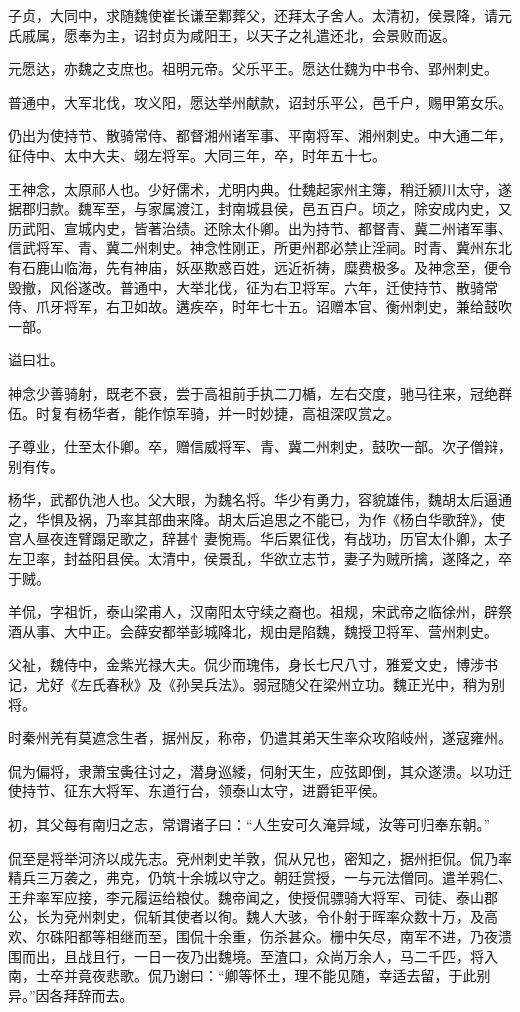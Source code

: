 \documentclass[12pt,UTF8]{ctexbook}
\begin{document}
子贞，大同中，求随魏使崔长谦至鄴葬父，还拜太子舍人。太清初，侯景降，请元氏戚属，愿奉为主，诏封贞为咸阳王，以天子之礼遣还北，会景败而返。

元愿达，亦魏之支庶也。祖明元帝。父乐平王。愿达仕魏为中书令、郢州刺史。

普通中，大军北伐，攻义阳，愿达举州献款，诏封乐平公，邑千户，赐甲第女乐。

仍出为使持节、散骑常侍、都督湘州诸军事、平南将军、湘州刺史。中大通二年，征侍中、太中大夫、翊左将军。大同三年，卒，时年五十七。

王神念，太原祁人也。少好儒术，尤明内典。仕魏起家州主簿，稍迁颍川太守，遂据郡归款。魏军至，与家属渡江，封南城县侯，邑五百户。顷之，除安成内史，又历武阳、宣城内史，皆著治绩。还除太仆卿。出为持节、都督青、冀二州诸军事、信武将军、青、冀二州刺史。神念性刚正，所更州郡必禁止淫祠。时青、冀州东北有石鹿山临海，先有神庙，妖巫欺惑百姓，远近祈祷，糜费极多。及神念至，便令毁撤，风俗遂改。普通中，大举北伐，征为右卫将军。六年，迁使持节、散骑常侍、爪牙将军，右卫如故。遘疾卒，时年七十五。诏赠本官、衡州刺史，兼给鼓吹一部。

谥曰壮。

神念少善骑射，既老不衰，尝于高祖前手执二刀楯，左右交度，驰马往来，冠绝群伍。时复有杨华者，能作惊军骑，并一时妙捷，高祖深叹赏之。

子尊业，仕至太仆卿。卒，赠信威将军、青、冀二州刺史，鼓吹一部。次子僧辩，别有传。

杨华，武都仇池人也。父大眼，为魏名将。华少有勇力，容貌雄伟，魏胡太后逼通之，华惧及祸，乃率其部曲来降。胡太后追思之不能已，为作《杨白华歌辞》，使宫人昼夜连臂蹋足歌之，辞甚忄妻惋焉。华后累征伐，有战功，历官太仆卿，太子左卫率，封益阳县侯。太清中，侯景乱，华欲立志节，妻子为贼所擒，遂降之，卒于贼。

羊侃，字祖忻，泰山梁甫人，汉南阳太守续之裔也。祖规，宋武帝之临徐州，辟祭酒从事、大中正。会薛安都举彭城降北，规由是陷魏，魏授卫将军、营州刺史。

父祉，魏侍中，金紫光禄大夫。侃少而瑰伟，身长七尺八寸，雅爱文史，博涉书记，尤好《左氏春秋》及《孙吴兵法》。弱冠随父在梁州立功。魏正光中，稍为别将。

时秦州羌有莫遮念生者，据州反，称帝，仍遣其弟天生率众攻陷岐州，遂寇雍州。

侃为偏将，隶萧宝夤往讨之，潜身巡緌，伺射天生，应弦即倒，其众遂溃。以功迁使持节、征东大将军、东道行台，领泰山太守，进爵钜平侯。

初，其父每有南归之志，常谓诸子曰：“人生安可久淹异域，汝等可归奉东朝。”

侃至是将举河济以成先志。兗州刺史羊敦，侃从兄也，密知之，据州拒侃。侃乃率精兵三万袭之，弗克，仍筑十余城以守之。朝廷赏授，一与元法僧同。遣羊鸦仁、王弁率军应接，李元履运给粮仗。魏帝闻之，使授侃骠骑大将军、司徒、泰山郡公，长为兗州刺史，侃斩其使者以徇。魏人大骇，令仆射于晖率众数十万，及高欢、尔硃阳都等相继而至，围侃十余重，伤杀甚众。栅中矢尽，南军不进，乃夜溃围而出，且战且行，一日一夜乃出魏境。至渣口，众尚万余人，马二千匹，将入南，士卒并竟夜悲歌。侃乃谢曰：“卿等怀土，理不能见随，幸适去留，于此别异。”因各拜辞而去。
\end{document}
